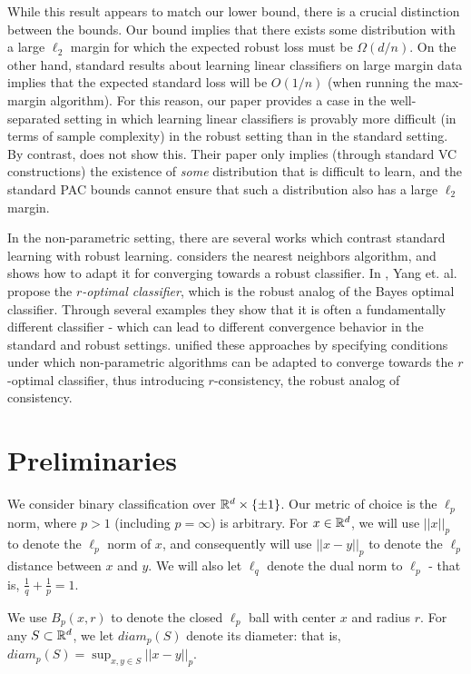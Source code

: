 While this result appears to match our lower bound, there is a crucial distinction between the bounds. Our bound implies that there exists some distribution with a large $\ell_2$ margin for which the expected robust loss must be $\Omega(d/n)$. On the other hand, standard results about learning linear classifiers on large margin data implies that the expected standard loss will be $O(1/n)$ (when running the max-margin algorithm). For this reason, our paper provides a case in the well-separated setting in which learning linear classifiers is provably more difficult (in terms of sample complexity) in the robust setting than in the standard setting. By contrast, \cite{Cullina18} does not show this. Their paper only implies (through standard VC constructions) the existence of \textit{some} distribution that is difficult to learn, and the standard PAC bounds cannot ensure that such a distribution also has a large $\ell_2$ margin.

In the non-parametric setting, there are several works which contrast standard learning with robust learning. \cite{WJC18} considers the nearest neighbors algorithm, and shows how to adapt it for converging towards a robust classifier. In \cite{YRWC19}, Yang et. al. propose the $r$\textit{-optimal classifier}, which is the robust analog of the Bayes optimal classifier. Through several examples they show that it is often a fundamentally different classifier - which can lead to different convergence behavior in the standard and robust settings. \cite{Bhattacharjee20} unified these approaches by specifying conditions under which non-parametric algorithms can be adapted to converge towards the $r$-optimal classifier, thus introducing $r$-consistency, the robust analog of consistency.

\section{Preliminaries}
We consider binary classification over $\mathbb R^d \times \{\pm 1\}$. Our metric of choice is the $\ell_p$ norm, where $p > 1$ (including $p = \infty$) is arbitrary. For $x \in \mathbb R^d$, we will use $||x||_p$ to denote the $\ell_p$ norm of $x$, and consequently will use $||x - y ||_p$ to denote the $\ell_p$ distance between $x$ and $y$. We will also let $\ell_q$ denote the dual norm to $\ell_p$ - that is, $\frac{1}{q} + \frac{1}{p}= 1$.

 We use $B_p(x,r)$ to denote the closed $\ell_p$ ball with center $x$ and radius $r$. For any $S \subset \mathbb R^d$, we let $diam_p(S)$ denote its diameter: that is, $diam_p(S) = \sup_{x, y \in S} ||x - y||_p.$

